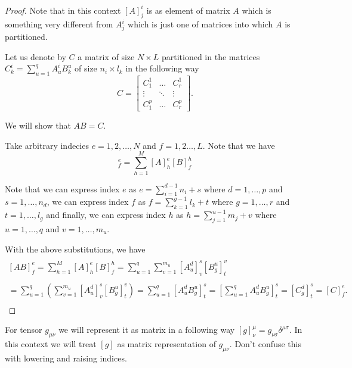 \documentclass[main.tex]{subfiles}
\begin{document}
\begin{proof}
 Note that in this context $[A]^i_j$ is as element of matrix $A$ which is something very different from $A^i_j$ which is just one of matrices into which $A$ is partitioned. 

Let us denote by $C$ a matrix of size $N\times L$ partitioned in the matrices $C^i_k = \sum_{u=1}^q A^i_u B^u_k$ of size $n_i\times l_k$ in the following way
\begin{equation}
C = \begin{bmatrix}
    C^1_1 &  \dots  & C^1_r \\
    \vdots &  \ddots & \vdots \\
    C^p_1 &  \dots  & C^p_r
\end{bmatrix}.
\end{equation}

We will show that $AB = C$.

Take arbitrary indecies $e=1, 2,  \dots, N$ and $f=1, 2 \dots, L$. Note that we have 
\begin{equation}
[AB]^e_f = \sum_{h=1}^M [A]^e_h [B]^h_f
\end{equation}

Note that we can express index $e$ as $e = \sum_{i=1}^{d-1} n_i + s$ where $d=1, \dots, p$ and $s=1, \dots, n_d$,
we can express index $f$ as $f = \sum_{k=1}^{g-1} l_k + t$ where $g=1, \dots, r$ and $t=1, \dots, l_g$ and
finally, we can express index $h$ as $h = \sum_{j=1}^{u-1}m_j + v$ where $u=1, \dots, q$ and 
$v = 1,\dots, m_u$.

With the above substitutions, we have
\begin{multline*}\\
[AB]^e_f = \sum_{h=1}^M [A]^e_h [B]^h_f = \sum_{u=1}^q \sum_{v=1}^{m_u} [A^d_u]^s_v [B^u_g]^v_t\\
\\ = \sum_{u=1}^q (\sum_{v=1}^{m_u} [A^d_u]^s_v [B^u_g]^v_t) = \sum_{u=1}^q [A^d_u B^u_g]^s_t = [\sum_{u=1}^q A^d_u B^u_g]^s_t = [C^d_g]^s_t = [C]^e_f.
\\
\end{multline*} 
\end{proof}

For tensor $g_{\mu\nu}$ we will represent it as matrix in a following way $[g]^\mu_\nu = g_{\nu\sigma} \delta^{\mu \sigma}$. In this context we will treat $[g]$ as matrix representation of $g_{\mu\nu}$. Don't confuse this with lowering and raising indices.
\end{document}
